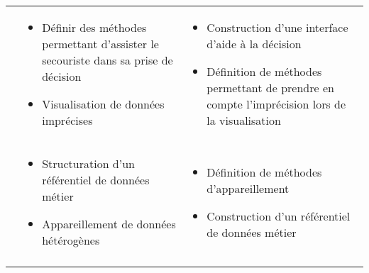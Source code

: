 \begin{tabular}{p{.2\textheight}L{.35\textheight}L{.35\textheight}}
& \begin{minipage}[t]{.35\textheight}
    \begin{itemize}
    \item Définir des méthodes permettant d'assister le secouriste
      dans sa prise de décision
    \item Visualisation de données imprécises
    \end{itemize}
  \end{minipage}& \begin{minipage}[t]{.35\textheight}
    \begin{itemize}
    \item Construction d'une interface d'aide à la décision
    \item Définition de méthodes permettant de prendre en compte
      l'imprécision lors de la visualisation
    \end{itemize}
  \end{minipage} \\
  \addlinespace[.5cm]
& \begin{minipage}[t]{.35\textheight}
    \begin{itemize}
    \item Structuration d'un référentiel de données métier
    \item Appareillement de données hétérogènes
    \end{itemize}
  \end{minipage}& \begin{minipage}[t]{.35\textheight}
    \begin{itemize}
    \item Définition de méthodes d'appareillement
    \item Construction d'un référentiel de données métier
    \end{itemize}
  \end{minipage}\\
  \addlinespace[.25cm]
  \bottomrule
\end{tabular}
